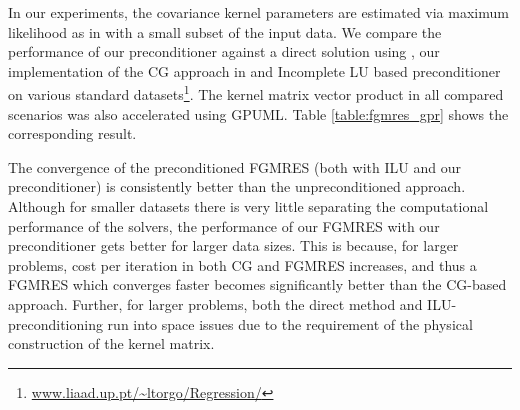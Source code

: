 \documentclass[10pt,journal,letterpaper,compsoc]{IEEEtran}
\begin{document}
In our experiments, the covariance kernel parameters are estimated via maximum likelihood as in \cite{GPML_Rasmussen} with a small subset of the input data. We compare the performance of our preconditioner against a direct solution using \cite{GPML_Rasmussen}, our implementation of the CG approach in \cite{GPML_Mackay} and Incomplete LU based preconditioner on various standard datasets\footnote{\url{www.liaad.up.pt/~ltorgo/Regression/}}. The kernel matrix vector product in all compared scenarios was also accelerated using GPUML. Table \ref{table:fgmres_gpr} shows the corresponding result.

The convergence of the preconditioned FGMRES (both with ILU and our preconditioner) is consistently better than the unpreconditioned approach. Although for smaller datasets there is very little separating the computational performance of the solvers, the performance of our FGMRES with our preconditioner gets better for larger data sizes. This is because, for larger problems, cost per iteration in both CG and FGMRES increases, and thus a FGMRES which converges faster becomes significantly better than the CG-based approach. Further, for larger problems, both the direct method and ILU-preconditioning run into space issues due to the requirement of the physical construction of the kernel matrix.
\end{document}
